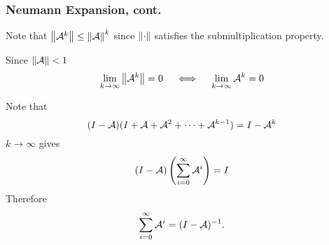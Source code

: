 \documentclass{beamer}
\begin{document}
\begin{frame}\frametitle{Neumann Expansion, cont.}
	Note that $\left\| \mathcal{A}^k \right\| \leq \left\| \mathcal{A} \right\|^{k}$ since $\left\| \cdot \right\|$ satisfies the submultiplication property. 
	
	\vfill 
	
	Since $\left\|\mathcal{A} \right\| < 1$
	\[ 
	\lim_{k\to \infty} \left\| \mathcal{A}^k \right\| = 0 \quad \iff \quad \lim_{k \to \infty}\mathcal{A}^k = 0 
	\]
	
	\vfill
	
	Note that
	\[ 
	(I - \mathcal{A}) ( I + \mathcal{A} + \mathcal{A}^2 + \cdots + \mathcal{A}^{k-1}) = I-\mathcal{A}^k 
	\]
	$k \to \infty$ gives
	\[ 
	(I-\mathcal{A})\left( \sum_{i = 0}^{\infty} \mathcal{A}^i \right) = I
	\]
	Therefore 
	\[ 
	\sum_{i=0}^{\infty} \mathcal{A}^i = (I-\mathcal{A})^{-1}. 
	\]
\end{frame}
\end{document}
